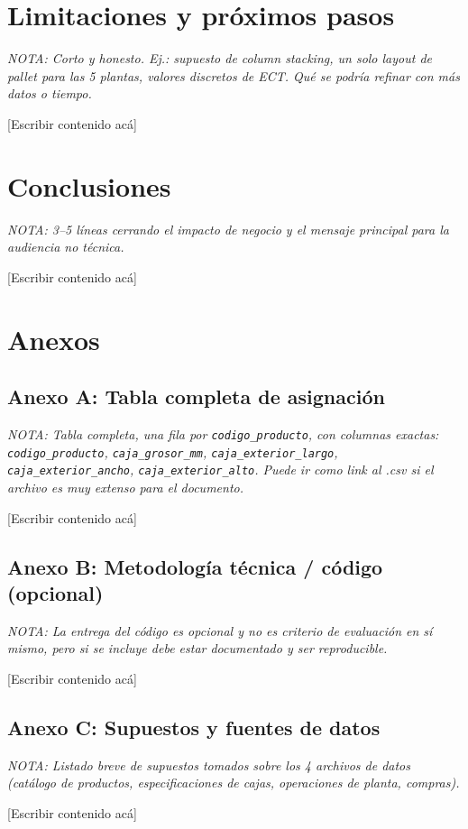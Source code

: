 \documentclass[11pt]{article}
\newcommand{\nota}[1]{{\itshape\color{notegray}\small NOTA: #1}\par\vspace{2pt}}
\newcommand{\placeholder}{\color{placeholdergray}[Escribir contenido acá]\color{black}\par\vspace{6pt}}
\begin{document}
\section{Limitaciones y próximos pasos}
\nota{Corto y honesto. Ej.: supuesto de column stacking, un solo layout de pallet para las 5 plantas, valores discretos de ECT. Qué se podría refinar con más datos o tiempo.}
\placeholder

\section{Conclusiones}
\nota{3--5 líneas cerrando el impacto de negocio y el mensaje principal para la audiencia no técnica.}
\placeholder

\newpage

\section*{Anexos}

\subsection*{Anexo A: Tabla completa de asignación}
\nota{Tabla completa, una fila por \texttt{codigo\_producto}, con columnas exactas: \texttt{codigo\_producto}, \texttt{caja\_grosor\_mm}, \texttt{caja\_exterior\_largo}, \texttt{caja\_exterior\_ancho}, \texttt{caja\_exterior\_alto}. Puede ir como link al .csv si el archivo es muy extenso para el documento.}
\placeholder

\subsection*{Anexo B: Metodología técnica / código (opcional)}
\nota{La entrega del código es opcional y no es criterio de evaluación en sí mismo, pero si se incluye debe estar documentado y ser reproducible.}
\placeholder

\subsection*{Anexo C: Supuestos y fuentes de datos}
\nota{Listado breve de supuestos tomados sobre los 4 archivos de datos (catálogo de productos, especificaciones de cajas, operaciones de planta, compras).}
\placeholder
\end{document}
